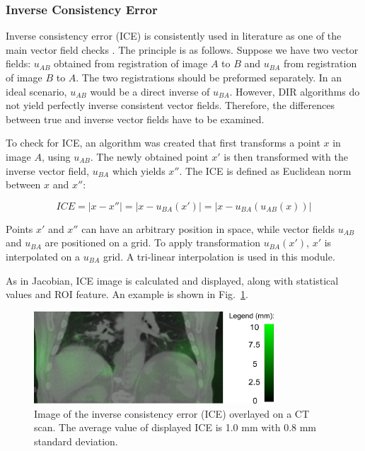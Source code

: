 \documentclass[type=dr, dr=rernat, accentcolor=tud7b,colorbacktitle, bigchapter, openright, twoside, 12pt ]{tudthesis}
\begin{document}
\subsubsection{Inverse Consistency Error}
\label{ICE}

Inverse consistency error (ICE) is consistently used in literature as one of the main vector field checks \cite{Christensen2001, Bender2009}. The principle is as follows. Suppose we have two vector fields: $u_{AB}$ obtained from registration of image $A$ to $B$ and $u_{BA}$ from registration of image $B$ to $A$. The two registrations
should be preformed separately. In an ideal scenario, $u_{AB}$ would be a direct inverse of $u_{BA}$. However, DIR algorithms do not yield perfectly inverse consistent vector fields. Therefore, the differences between true and inverse vector fields have to be examined.


To check for ICE, an algorithm was created that first transforms a point $x$ in image $A$, using $u_{AB}$. The newly obtained point $x'$ is then transformed with the inverse vector
field, $u_{BA}$ which yields $x''$. The ICE is defined as Euclidean norm between $x$ and $x''$:

\begin{equation}
\label{eq:ice}
ICE = |x - x''| = |x - u_{BA}(x')| = |x - u_{BA}(u_{AB}(x))|
\end{equation}

Points $x'$ and $x''$ can have an arbitrary position in space, while vector fields $u_{AB}$ and $u_{BA}$ are positioned on a grid. To apply transformation $u_{BA}(x')$, $x'$ is interpolated on a $u_{BA}$ grid. A tri-linear interpolation is used in this module.

As in Jacobian, ICE image is calculated and displayed, along with statistical values and ROI feature. An example is shown in Fig.~\ref{inv}.




\begin{figure}[H]
\begin{center}
\includegraphics[width=0.8\textwidth]{./Images/inv.png}
\caption{Image of the inverse consistency error (ICE) overlayed on a CT scan. The average value of displayed ICE is 1.0 mm with 0.8 mm standard deviation.}
\label{inv}
\end{center}
\end{figure}
\end{document}
